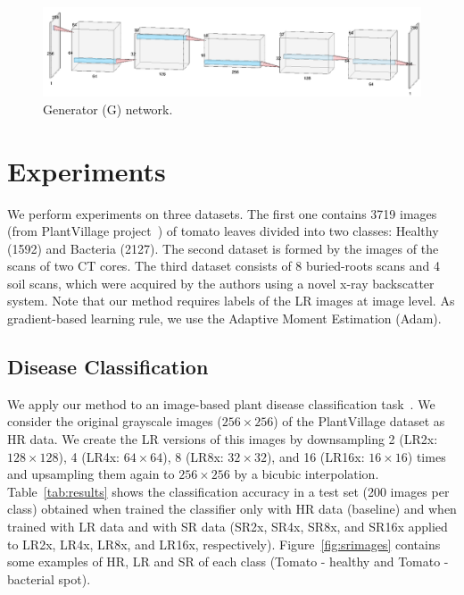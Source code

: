 \documentclass[10pt,twocolumn,letterpaper]{article}
\begin{document}
\begin{figure}[h]
\begin{center}
\includegraphics[scale=0.30]{G_net.png}
\end{center}
\label{fig:G_net}
\caption{Generator (G) network.}
\end{figure}


\section{Experiments}
\label{sec:experiments}


We perform experiments on three datasets. The first one contains 3719 images (from PlantVillage project~\cite{Hughes2015}) of tomato leaves divided into two classes: Healthy (1592) and Bacteria (2127). The second dataset is formed by the images of the scans of two CT cores.  The third dataset consists of 8 buried-roots scans and 4 soil scans, which were acquired by the authors using a novel x-ray backscatter system. Note that our method requires labels of the LR images at image level. As gradient-based learning rule, we use the Adaptive Moment Estimation (Adam). 

\subsection{Disease Classification}
We apply our method to an image-based plant disease classification task~\cite{Mohanty2016}. We consider the original grayscale images ($256\times 256$) of the PlantVillage dataset as HR data. We create the LR versions of this images by downsampling 2 (LR2x: $128\times 128$), 4 (LR4x: $64\times 64$), 8 (LR8x: $32\times 32$), and 16 (LR16x: $16\times 16$) times and upsampling them again to $256\times 256$ by a bicubic interpolation. Table~\ref{tab:results} shows the classification accuracy in a test set (200 images per class) obtained when trained the classifier only with HR data (baseline) and when trained with LR data and with SR data (SR2x, SR4x, SR8x, and SR16x applied to LR2x, LR4x, LR8x, and LR16x, respectively). Figure~\ref{fig:srimages} contains some examples of HR, LR and SR of each class (Tomato - healthy and Tomato - bacterial spot).
\end{document}
